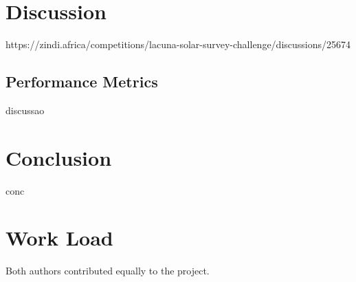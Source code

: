\documentclass[conference]{IEEEtran}
\begin{document}
\section{Discussion} 

https://zindi.africa/competitions/lacuna-solar-survey-challenge/discussions/25674

\subsection{Performance Metrics}

discussao


\section{Conclusion}

conc


\section*{Work Load}

Both authors contributed equally to the project.



\end{document}
